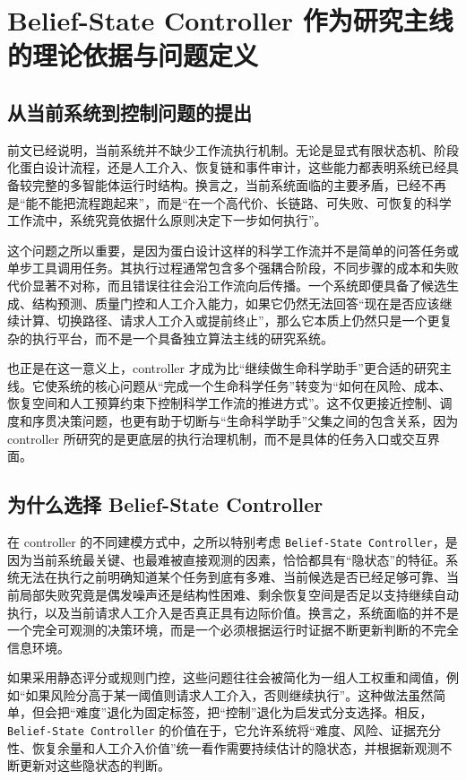 \section{Belief-State Controller 作为研究主线的理论依据与问题定义}

\subsection{从当前系统到控制问题的提出}

前文已经说明，当前系统并不缺少工作流执行机制。无论是显式有限状态机、阶段化蛋白设计流程，还是人工介入、恢复链和事件审计，这些能力都表明系统已经具备较完整的多智能体运行时结构。换言之，当前系统面临的主要矛盾，已经不再是“能不能把流程跑起来”，而是“在一个高代价、长链路、可失败、可恢复的科学工作流中，系统究竟依据什么原则决定下一步如何执行”。

这个问题之所以重要，是因为蛋白设计这样的科学工作流并不是简单的问答任务或单步工具调用任务。其执行过程通常包含多个强耦合阶段，不同步骤的成本和失败代价显著不对称，而且错误往往会沿工作流向后传播。一个系统即便具备了候选生成、结构预测、质量门控和人工介入能力，如果它仍然无法回答“现在是否应该继续计算、切换路径、请求人工介入或提前终止”，那么它本质上仍然只是一个更复杂的执行平台，而不是一个具备独立算法主线的研究系统。

也正是在这一意义上，controller 才成为比“继续做生命科学助手”更合适的研究主线。它使系统的核心问题从“完成一个生命科学任务”转变为“如何在风险、成本、恢复空间和人工预算约束下控制科学工作流的推进方式”。这不仅更接近控制、调度和序贯决策问题，也更有助于切断与“生命科学助手”父集之间的包含关系，因为 controller 所研究的是更底层的执行治理机制，而不是具体的任务入口或交互界面。

\subsection{为什么选择 Belief-State Controller}

在 controller 的不同建模方式中，之所以特别考虑 \texttt{Belief-State Controller}，是因为当前系统最关键、也最难被直接观测的因素，恰恰都具有“隐状态”的特征。系统无法在执行之前明确知道某个任务到底有多难、当前候选是否已经足够可靠、当前局部失败究竟是偶发噪声还是结构性困难、剩余恢复空间是否足以支持继续自动执行，以及当前请求人工介入是否真正具有边际价值。换言之，系统面临的并不是一个完全可观测的决策环境，而是一个必须根据运行时证据不断更新判断的不完全信息环境。

如果采用静态评分或规则门控，这些问题往往会被简化为一组人工权重和阈值，例如“如果风险分高于某一阈值则请求人工介入，否则继续执行”。这种做法虽然简单，但会把“难度”退化为固定标签，把“控制”退化为启发式分支选择。相反，\texttt{Belief-State Controller} 的价值在于，它允许系统将“难度、风险、证据充分性、恢复余量和人工介入价值”统一看作需要持续估计的隐状态，并根据新观测不断更新对这些隐状态的判断。

